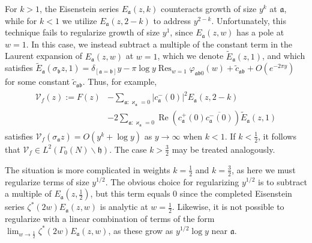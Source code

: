 \documentclass[11pt,reqno]{amsart}
\theoremstyle{plain}
\theoremstyle{definition}
\numberwithin{equation}{section}
\renewcommand{\Re}{\operatorname{Re}}
\DeclareMathOperator*{\Res}{Res}
\begin{document}
For $k>1$, the Eisenstein series $E_\mathfrak{a}(z,k)$ counteracts growth of size $y^k$ at $\mathfrak{a}$, while for $k<1$ we utilize $E_\mathfrak{a}(z,2-k)$ to address $y^{2-k}$. Unfortunately, this technique fails to regularize growth of size $y^1$, since $E_\mathfrak{a}(z,w)$ has a pole at $w=1$. In this case, we instead subtract a multiple of the constant term in the Laurent expansion of $E_\mathfrak{a}(z,w)$ at $w=1$, which we denote $\widetilde{E}_\mathfrak{a}(z,1)$, and which satisfies $\widetilde{E}_\mathfrak{a}(\sigma_{\mathfrak{b}} z,1) = \delta_{[\mathfrak{a} = \mathfrak{b}]} y - \pi \log y \Res_{w=1} \varphi_{\mathfrak{ab}0}(w) + \widetilde{c}_{\mathfrak{ab}}+O(e^{-2\pi y})$ for some constant $\widetilde{c}_{\mathfrak{ab}}$. Thus, for example,
\begin{align} 
	\begin{split} \label{eq:regularization}
		\mathcal{V}_f(z) := F(z) 
				&- \sum_{\mathfrak{a} : \varkappa_\mathfrak{a} = 0}
				\vert c_\mathfrak{a}^-(0) \vert^2 E_\mathfrak{a}(z,2-k) \\
				&- 2\sum_{\mathfrak{a} : \varkappa_\mathfrak{a} = 0}
				\Re ( c_\mathfrak{a}^+(0) \overline{c_\mathfrak{a}^-(0)})
				\widetilde{E}_\mathfrak{a}(z,1)
	\end{split}
\end{align}
satisfies $\mathcal{V}_f(\sigma_{\mathfrak{a}} z) = O(y^{k} + \log y)$ as $y \to \infty$ when $k<1$. If $k<\frac{1}{2}$, it follows that $\mathcal{V}_f \in L^2(\Gamma_0(N) \backslash \mathfrak{h})$. The case $k>\frac{3}{2}$ may be treated analogously. 

The situation is more complicated in weights $k=\frac{1}{2}$ and $k=\frac{3}{2}$, as here we must regularize terms of size $y^{1/2}$. The obvious choice for regularizing $y^{1/2}$ is to subtract a multiple of $E_\mathfrak{a}(z,\frac{1}{2})$, but this term equals $0$ since the completed Eisenstein series $\zeta^*(2w) E_\mathfrak{a}(z,w)$ is analytic at $w=\frac{1}{2}$. Likewise, it is not possible to regularize with a linear combination of terms of the form $\lim_{w\to \frac{1}{2}} \zeta^*(2w) E_\mathfrak{a}(z,w)$, as these grow as $y^{1/2} \log y$ near $\mathfrak{a}$.
\end{document}
